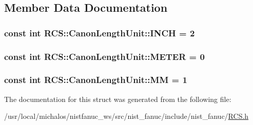 \subsection{Member Data Documentation}
\hypertarget{structRCS_1_1CanonLengthUnit_af8429e8f694f1ece8892964002e125a7}{
\subsubsection[{I\-N\-C\-H}]{\setlength{\rightskip}{0pt plus 5cm}const int R\-C\-S\-::\-Canon\-Length\-Unit\-::\-I\-N\-C\-H = 2\hspace{0.3cm}{\ttfamily [static]}}}\label{structRCS_1_1CanonLengthUnit_af8429e8f694f1ece8892964002e125a7}
\hypertarget{structRCS_1_1CanonLengthUnit_aa0223882057177e61d21fffb0153577d}{
\subsubsection[{M\-E\-T\-E\-R}]{\setlength{\rightskip}{0pt plus 5cm}const int R\-C\-S\-::\-Canon\-Length\-Unit\-::\-M\-E\-T\-E\-R = 0\hspace{0.3cm}{\ttfamily [static]}}}\label{structRCS_1_1CanonLengthUnit_aa0223882057177e61d21fffb0153577d}
\hypertarget{structRCS_1_1CanonLengthUnit_ad47d86e234efe90b2f4067d706c75294}{
\subsubsection[{M\-M}]{\setlength{\rightskip}{0pt plus 5cm}const int R\-C\-S\-::\-Canon\-Length\-Unit\-::\-M\-M = 1\hspace{0.3cm}{\ttfamily [static]}}}\label{structRCS_1_1CanonLengthUnit_ad47d86e234efe90b2f4067d706c75294}


The documentation for this struct was generated from the following file\-:\begin{DoxyCompactItemize}
\item 
/usr/local/michalos/nistfanuc\-\_\-ws/src/nist\-\_\-fanuc/include/nist\-\_\-fanuc/\hyperlink{RCS_8h}{R\-C\-S.\-h}\end{DoxyCompactItemize}
